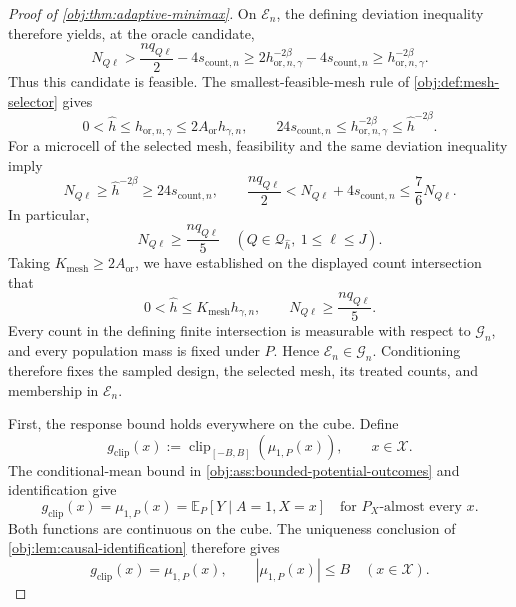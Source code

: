 \documentclass[11pt]{article}
\begin{document}
\begin{proof}[Proof of \cref{obj:thm:adaptive-minimax}]
On \(\mathcal E_n\), the defining deviation inequality therefore yields, at the oracle candidate,
\[
N_{Q\ell}
>\frac{nq_{Q\ell}}2-4s_{\mathrm{count},n}
\ge2h_{\mathrm{or},n,\gamma}^{-2\beta}
 -4s_{\mathrm{count},n}
\ge h_{\mathrm{or},n,\gamma}^{-2\beta}.
\]
Thus this candidate is feasible. The smallest-feasible-mesh rule of \cref{obj:def:mesh-selector} gives
\[
0<\widehat h\le h_{\mathrm{or},n,\gamma}
\le2A_{\mathrm{or}}h_{\gamma,n},
\qquad
24s_{\mathrm{count},n}
\le h_{\mathrm{or},n,\gamma}^{-2\beta}
\le\widehat h^{-2\beta}.
\]
For a microcell of the selected mesh, feasibility and the same deviation inequality imply
\[
N_{Q\ell}\ge\widehat h^{-2\beta}
\ge24s_{\mathrm{count},n},
\qquad
\frac{nq_{Q\ell}}2
<N_{Q\ell}+4s_{\mathrm{count},n}
\le\frac76N_{Q\ell}.
\]
In particular,
\[
N_{Q\ell}\ge\frac{nq_{Q\ell}}5
\quad(Q\in\mathcal Q_{\widehat h},\ 1\le\ell\le J).
\]
Taking \(K_{\mathrm{mesh}}\ge2A_{\mathrm{or}}\), we have established on the displayed count intersection that
\[
0<\widehat h\le K_{\mathrm{mesh}}h_{\gamma,n},
\qquad
N_{Q\ell}\ge\frac{nq_{Q\ell}}5.
\]
Every count in the defining finite intersection is measurable with respect to \(\mathcal G_n\), and every population mass is fixed under \(P\). Hence \(\mathcal E_n\in\mathcal G_n\). Conditioning therefore fixes the sampled design, the selected mesh, its treated counts, and membership in \(\mathcal E_n\).

First, the response bound holds everywhere on the cube. Define
\[
g_{\mathrm{clip}}(x)
:=
\operatorname{clip}_{[-B,B]}(\mu_{1,P}(x)),
\qquad x\in\mathcal X.
\]
The conditional-mean bound in \cref{obj:ass:bounded-potential-outcomes} and identification give
\[
g_{\mathrm{clip}}(x)
=
\mu_{1,P}(x)
=
\mathbb E_P[Y\mid A=1,X=x]
\quad\text{for }P_X\text{-almost every }x.
\]
Both functions are continuous on the cube. The uniqueness conclusion of \cref{obj:lem:causal-identification} therefore gives
\[
g_{\mathrm{clip}}(x)=\mu_{1,P}(x),
\qquad
|\mu_{1,P}(x)|\le B
\quad(x\in\mathcal X).
\]


\end{proof}
\end{document}
